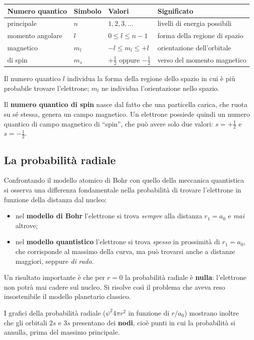 \documentclass[11pt, a4paper, openright]{book}
\begin{document}
\begin{center}
\begin{tabular}{llll}
\toprule
\textbf{Numero quantico} & \textbf{Simbolo} & \textbf{Valori} & \textbf{Significato} \\
\midrule
principale & $n$ & $1, 2, 3, \dots$ & livelli di energia possibili \\
momento angolare & $l$ & $0 \leq l \leq n-1$ & forma della regione di spazio \\
magnetico & $m_l$ & $-l \leq m_l \leq +l$ & orientazione dell'orbitale \\
di spin & $m_s$ & $+\frac{1}{2}$ oppure $-\frac{1}{2}$ & verso del momento magnetico \\
\bottomrule
\end{tabular}
\end{center}

Il numero quantico $l$ individua la forma della regione dello spazio in cui è più probabile trovare l'elettrone; $m_l$ ne individua l'orientazione nello spazio.

Il \textbf{numero quantico di spin} nasce dal fatto che una particella carica, che ruota su sé stessa, genera un campo magnetico. Un elettrone possiede quindi un numero quantico di campo magnetico di ``spin'', che può avere solo due valori: $s = +\frac{1}{2}$ e $s = -\frac{1}{2}$.

\subsection{La probabilità radiale}
Confrontando il modello atomico di Bohr con quello della meccanica quantistica si osserva una differenza fondamentale nella probabilità di trovare l'elettrone in funzione della distanza dal nucleo:
\begin{itemize}
    \item nel \textbf{modello di Bohr} l'elettrone si trova \emph{sempre} alla distanza $r_1 = a_0$ e \emph{mai} altrove;
    \item nel \textbf{modello quantistico} l'elettrone si trova \emph{spesso} in prossimità di $r_1 = a_0$, che corrisponde al massimo della curva, ma può trovarsi anche a distanze maggiori, seppure \emph{di rado}.
\end{itemize}
Un risultato importante è che per $r = 0$ la probabilità radiale è \textbf{nulla}: l'elettrone non potrà mai cadere sul nucleo. Si risolve così il problema che aveva reso insostenibile il modello planetario classico.

I grafici della probabilità radiale ($\psi^2 4\pi r^2$ in funzione di $r/a_0$) mostrano inoltre che gli orbitali $2s$ e $3s$ presentano dei \textbf{nodi}, cioè punti in cui la probabilità si annulla, prima del massimo principale.
\end{document}
